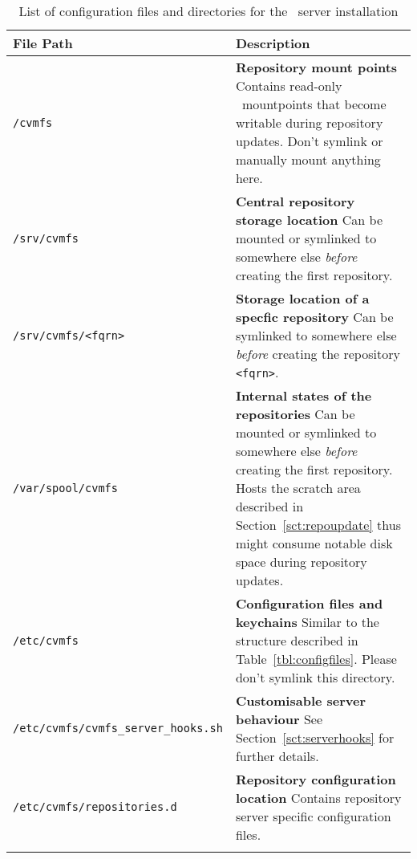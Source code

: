 \begin{longtable}{lX}
	\toprule
	{\bf\centering File Path} & {\bf\centering Description} \\
	\midrule

	\texttt{/cvmfs} & \textbf{Repository mount points} \newline
	Contains read-only \aufs\ mountpoints that become writable during repository updates. Don't symlink or manually mount anything here. \\
	\addlinespace

	\texttt{/srv/cvmfs} & \textbf{Central repository storage location} \newline
	Can be mounted or symlinked to somewhere else \emph{before} creating the first repository. \\
	\addlinespace

	\texttt{/srv/cvmfs/<fqrn>} & \textbf{Storage location of a specfic repository} \newline
	Can be symlinked to somewhere else \emph{before} creating the repository \texttt{<fqrn>}. \\
	\addlinespace

	\texttt{/var/spool/cvmfs} & \textbf{Internal states of the repositories} \newline
	Can be mounted or symlinked to somewhere else \emph{before} creating the first repository. Hosts the scratch area described in Section~\ref{sct:repoupdate} thus might consume notable disk space during repository updates. \\			\addlinespace

	\texttt{/etc/cvmfs} & \textbf{Configuration files and keychains} \newline
	Similar to the structure described in Table~\ref{tbl:configfiles}. Please don't symlink this directory. \\
	\addlinespace

	\texttt{/etc/cvmfs/cvmfs\_server\_hooks.sh} & \textbf{Customisable server behaviour} \newline
	See Section~\ref{sct:serverhooks} for further details. \\
	\addlinespace

	\texttt{/etc/cvmfs/repositories.d} & \textbf{Repository configuration location} \newline
	Contains repository server specific configuration files.
	 \\
	\bottomrule
	\caption{List of configuration files and directories for the \cvmfs\ server installation}
	\label{tbl:serveranatomyelements}
\end{longtable}
